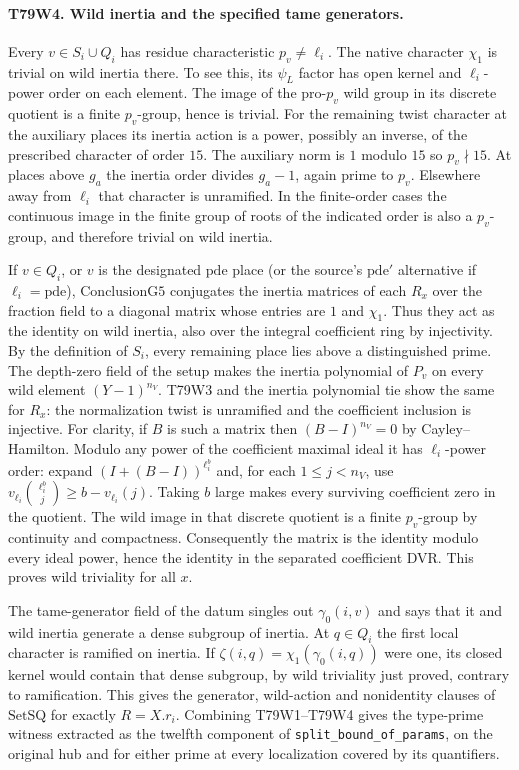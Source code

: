 \paragraph{T79W4. Wild inertia and the specified tame generators.}
Every $v\in S_i\cup Q_i$ has residue characteristic $p_v\ne\ell_i$.
The native character $\chi_1$ is trivial on wild inertia there.
To see this, its $\psi_L$ factor has open kernel and $\ell_i$-power
order on each element. The image of the pro-$p_v$ wild group in its
discrete quotient is a finite $p_v$-group, hence is trivial.
For the remaining twist character at the auxiliary places its inertia
action is a power, possibly an inverse, of the prescribed character of
order $15$. The auxiliary norm is $1$ modulo $15$ so $p_v\nmid15$.
At places above $g_a$ the inertia order divides $g_a-1$, again
prime to $p_v$. Elsewhere away from $\ell_i$ that character is
unramified. In the finite-order cases the continuous image in the
finite group of roots of the indicated order is also a $p_v$-group,
and therefore trivial on wild inertia.

If $v\in Q_i$, or $v$ is the designated $\mathrm{pde}$ place
(or the source's $\mathrm{pde}'$ alternative if
$\ell_i=\mathrm{pde}$), $\mathrm{ConclusionG5}$ conjugates the
inertia matrices of each $R_x$ over the fraction field to a diagonal
matrix whose entries are $1$ and $\chi_1$. Thus they act as the
identity on wild inertia, also over the integral coefficient ring
by injectivity. By the definition of $S_i$, every remaining place
lies above a distinguished prime. The depth-zero field of the setup
makes the inertia polynomial of $P_v$ on every wild element
$(Y-1)^{n_V}$. T79W3 and the inertia polynomial tie show the same
for $R_x$: the normalization twist is unramified and the coefficient
inclusion is injective. For clarity, if $B$ is such a matrix then
$(B-I)^{n_V}=0$ by Cayley--Hamilton. Modulo any power of the
coefficient maximal ideal it has $\ell_i$-power order: expand
$(I+(B-I))^{\ell_i^b}$ and, for each $1\le j<n_V$, use
$v_{\ell_i}\binom{\ell_i^b}{j}\ge b-v_{\ell_i}(j)$.
Taking $b$ large makes every surviving coefficient zero in the
quotient. The wild image in that discrete quotient is a finite
$p_v$-group by continuity and compactness. Consequently the
matrix is the identity modulo every ideal power, hence the identity
in the separated coefficient DVR. This proves wild triviality for
all $x$.

The tame-generator field of the datum singles out $\gamma_0(i,v)$
and says that it and wild inertia generate a dense subgroup of
inertia. At $q\in Q_i$ the first local character is ramified
on inertia. If $\zeta(i,q)=\chi_1(\gamma_0(i,q))$ were one,
its closed kernel would contain that dense subgroup, by wild
triviality just proved, contrary to ramification. This gives the
generator, wild-action and nonidentity clauses of $\mathrm{SetSQ}$
for exactly $R=X.r_i$. Combining T79W1--T79W4 gives the type-prime
witness extracted as the twelfth component of
\texttt{split\_bound\_of\_params}, on the original hub and for
either prime at every localization covered by its quantifiers.
